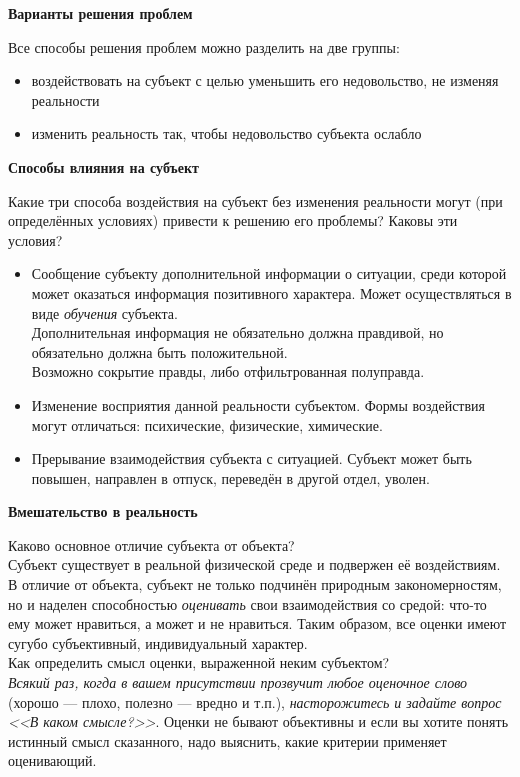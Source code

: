 \documentclass{article}
\newcommand{\note}[1]{\textit{#1}}
\renewcommand{\subsection}[1]{
	\vspace{2em}
	\begin{flushright}
		\large
		\textbf{#1}
	\end{flushright}
	}
\begin{document}
\subsection{Варианты решения проблем}
Все способы решения проблем можно разделить на две группы:
\begin{itemize}
	\item воздействовать на субъект с целью уменьшить его недовольство, не изменяя реальности
	\item изменить реальность так, чтобы недовольство субъекта ослабло
\end{itemize}
\subsection{Способы влияния на субъект}
Какие три способа воздействия на субъект без изменения реальности могут (при определённых условиях) привести к решению его проблемы? Каковы эти условия?
\begin{itemize}
	\item Сообщение субъекту дополнительной информации о ситуации, среди которой может оказаться информация позитивного характера. Может осуществляться в виде \note{обучения} субъекта.\\Дополнительная информация не обязательно должна правдивой, но обязательно должна быть положительной.\\Возможно сокрытие правды, либо отфильтрованная полуправда.
	\item Изменение восприятия данной реальности субъектом. Формы воздействия могут отличаться: психические, физические, химические.
	\item Прерывание взаимодействия субъекта с ситуацией. Субъект может быть повышен, направлен в отпуск, переведён в другой отдел, уволен.
\end{itemize}
\subsection{Вмешательство в реальность}
Каково основное отличие субъекта от объекта?
\\
Субъект существует в реальной физической среде и подвержен её воздействиям. В отличие от объекта, субъект не только подчинён природным закономерностям, но и наделен способностью \note{оценивать} свои взаимодействия со средой: что-то ему может нравиться, а может и не нравиться. Таким образом, все оценки имеют сугубо субъективный, индивидуальный характер.
\\
Как определить смысл оценки, выраженной неким субъектом?
\\
\note{Всякий раз, когда в вашем присутствии прозвучит любое оценочное слово} (хорошо --- плохо, полезно --- вредно и т.п.), \note{насторожитесь и задайте вопрос <<В каком смысле?>>}. Оценки не бывают объективны и если вы хотите понять истинный смысл сказанного, надо выяснить, какие критерии применяет оценивающий.
\end{document}
